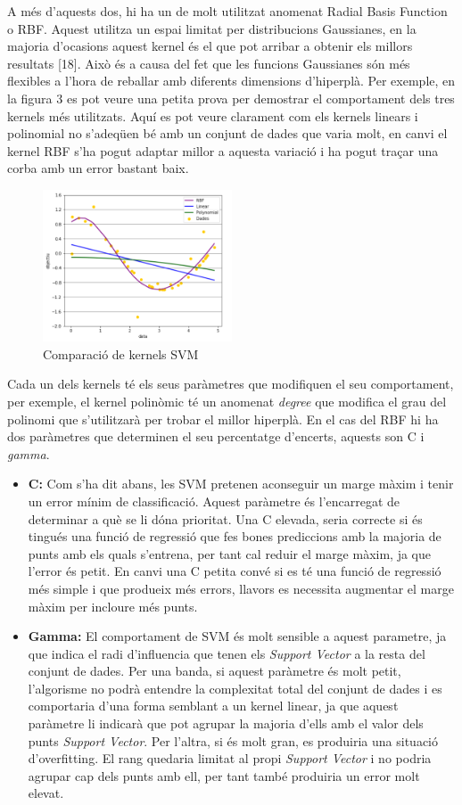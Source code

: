 \documentclass[10pt,a4paper,twocolumn,twoside]{article}
\begin{document}
A més d'aquests dos, hi ha un de molt utilitzat anomenat Radial Basis Function o RBF. Aquest utilitza un espai limitat per distribucions Gaussianes, en la majoria d'ocasions aquest kernel és el que pot arribar a obtenir els millors resultats [18]. Això és a causa del fet que les funcions Gaussianes són més flexibles a l'hora de reballar amb diferents dimensions d'hiperplà. Per exemple, en la figura 3 es pot veure una petita prova per demostrar el comportament dels tres kernels més utilitzats. Aquí es pot veure clarament com els kernels linears i polinomial no s'adeqüen bé amb un conjunt de dades que varia molt, en canvi el kernel RBF s'ha pogut adaptar millor a aquesta variació i ha pogut traçar una corba amb un error bastant baix.
\begin{figure}[!h]
\centering
	\includegraphics[width=0.5\textwidth]{../img/KernelsSVM}
	\caption{Comparació de kernels SVM}
	\label{fig-KernelsSVM}
\end{figure}

Cada un dels kernels té els seus paràmetres que modifiquen el seu comportament, per exemple, el kernel polinòmic té un anomenat \textit{degree} que modifica el grau del polinomi que s'utilitzarà per trobar el millor hiperplà. En el cas del RBF hi ha dos paràmetres que determinen el seu percentatge d'encerts, aquests son C i \textit{gamma}.
\begin{itemize}
\item \textbf{C:} Com s'ha dit abans, les SVM pretenen aconseguir un marge màxim i tenir un error mínim de classificació. Aquest paràmetre és l'encarregat de determinar a què se li dóna prioritat. Una C elevada, seria correcte si és tingués una funció de regressió que fes bones prediccions amb la majoria de punts amb els quals s'entrena, per tant cal reduir el marge màxim, ja que l'error és petit. En canvi una C petita convé si es té una funció de regressió més simple i que produeix més errors, llavors es necessita augmentar el marge màxim per incloure més punts.
\item \textbf{Gamma:} El comportament de SVM és molt sensible a aquest parametre, ja que indica el radi d'influencia que tenen els \textit{Support Vector} a la resta del conjunt de dades. Per una banda, si aquest paràmetre és molt petit, l'algorisme no podrà entendre la complexitat total del conjunt de dades i es comportaria d'una forma semblant a un kernel linear, ja que aquest paràmetre li indicarà que pot agrupar la majoria d'ells amb el valor dels punts \textit{Support Vector}. Per l'altra, si és molt gran, es produiria una situació d'overfitting. El rang quedaria limitat al propi \textit{Support Vector} i no podria agrupar cap dels punts amb ell, per tant també produiria un error molt elevat.
\end{itemize}
\end{document}
